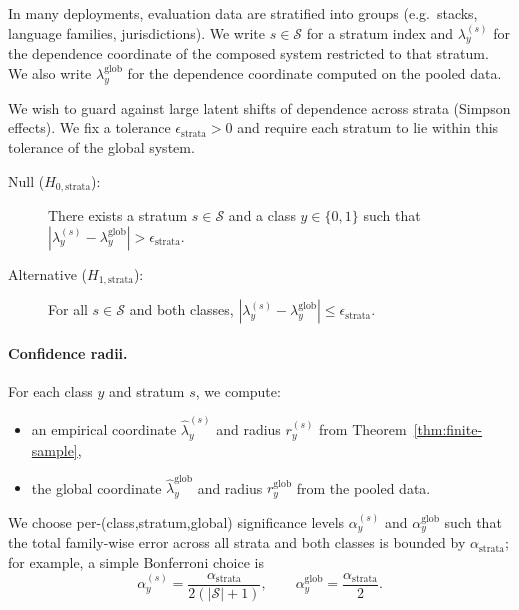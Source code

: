 In many deployments, evaluation data are stratified into groups
(e.g.\ stacks, language families, jurisdictions).
We write $s \in \mathcal{S}$ for a stratum index and
$\lambda_y^{(s)}$ for the dependence coordinate of the composed
system restricted to that stratum.
We also write $\lambda_y^{\mathrm{glob}}$ for the dependence
coordinate computed on the pooled data.

We wish to guard against large latent shifts of dependence across
strata (Simpson effects).
We fix a tolerance $\epsilon_{\mathrm{strata}} > 0$ and require each
stratum to lie within this tolerance of the global system.

\begin{hypothesis}
\label{hyp:H3}
\mbox{}
\begin{description}
  \item[Null ($H_{0,\mathrm{strata}}$):]
    There exists a stratum $s \in \mathcal{S}$ and a class
    $y \in \{0,1\}$ such that
    \(
      |\lambda_y^{(s)} - \lambda_y^{\mathrm{glob}}|
      > \epsilon_{\mathrm{strata}}.
    \)
  \item[Alternative ($H_{1,\mathrm{strata}}$):]
    For all $s \in \mathcal{S}$ and both classes,
    \(
      |\lambda_y^{(s)} - \lambda_y^{\mathrm{glob}}|
      \le \epsilon_{\mathrm{strata}}.
    \)
\end{description}
\end{hypothesis}

\paragraph{Confidence radii.}
For each class $y$ and stratum $s$, we compute:

\begin{itemize}
  \item an empirical coordinate $\hat\lambda_y^{(s)}$ and radius
    $r_y^{(s)}$ from Theorem~\ref{thm:finite-sample},
  \item the global coordinate $\hat\lambda_y^{\mathrm{glob}}$ and
    radius $r_y^{\mathrm{glob}}$ from the pooled data.
\end{itemize}

We choose per-(class,stratum,global) significance levels
$\alpha_y^{(s)}$ and $\alpha_y^{\mathrm{glob}}$ such that the total
family-wise error across all strata and both classes is bounded by
$\alpha_{\mathrm{strata}}$; for example, a simple Bonferroni choice is
\[
  \alpha_y^{(s)} = \frac{\alpha_{\mathrm{strata}}}{2(|\mathcal{S}|+1)},
  \qquad
  \alpha_y^{\mathrm{glob}} = \frac{\alpha_{\mathrm{strata}}}{2}.
\]

